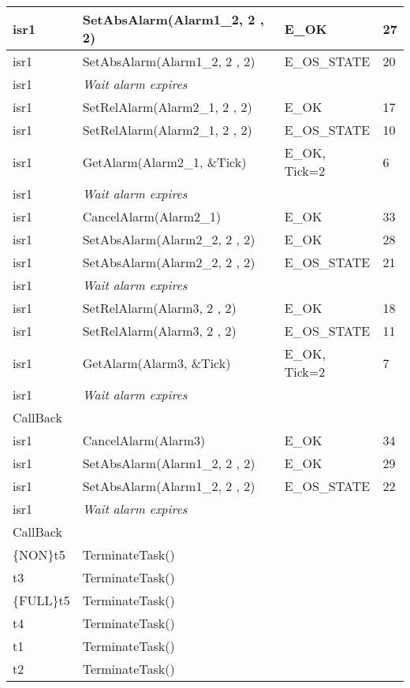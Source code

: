 \documentclass[10pt]{article}
\newlength{\Li}\settowidth{\Li}{Running}
\newlength{\Lii}\setlength{\Lii}{7cm}
\newlength{\Liiii}\setlength{\Liiii}{0.9cm}
\newlength{\Liii}\setlength{\Liii}{\textwidth} \addtolength{\Liii}{-\Li} \addtolength{\Liii}{-\Lii} \addtolength{\Liii}{-\Liiii}
\begin{document}
\begin{supertabular}{|p{\Li}|p{\Lii}|p{\Liii}|p{\Liiii}|}
	isr1	& SetAbsAlarm(Alarm1\_2, 2 , 2)						& E\_OK					& 27 \\ \hline
	isr1	& SetAbsAlarm(Alarm1\_2, 2 , 2)						& E\_OS\_STATE			& 20 \\ \hline
	isr1	& \textit{Wait alarm expires}						 	& 						&  \\ \hline 
	
	isr1	& SetRelAlarm(Alarm2\_1, 2 , 2)						& E\_OK					& 17 \\ \hline
	isr1	& SetRelAlarm(Alarm2\_1, 2 , 2)						& E\_OS\_STATE			& 10 \\ \hline
	isr1	& GetAlarm(Alarm2\_1, \&Tick)							& E\_OK, Tick=2			& 6 \\ \hline
	isr1	& \textit{Wait alarm expires}						 	& 						&  \\ \hline 
	isr1	& CancelAlarm(Alarm2\_1)							& E\_OK					& 33 \\ \hline
	
	isr1	& SetAbsAlarm(Alarm2\_2, 2 , 2)						& E\_OK					& 28 \\ \hline
	isr1	& SetAbsAlarm(Alarm2\_2, 2 , 2)						& E\_OS\_STATE			& 21 \\ \hline
	isr1	& \textit{Wait alarm expires}						 	& 						& \\ \hline 
	
	isr1	& SetRelAlarm(Alarm3, 2 , 2)							& E\_OK					& 18 \\ \hline
	isr1	& SetRelAlarm(Alarm3, 2 , 2)							& E\_OS\_STATE			& 11 \\ \hline
	isr1	& GetAlarm(Alarm3, \&Tick)							& E\_OK, Tick=2			& 7 \\ \hline
	isr1	& \textit{Wait alarm expires}						 	& 						& \\ \hline 
	CallBack & 											& 						& \\ \hline 
	isr1	& CancelAlarm(Alarm3)								& E\_OK					& 34 \\ \hline
	
	isr1	& SetAbsAlarm(Alarm1\_2, 2 , 2)						& E\_OK					& 29 \\ \hline
	isr1	& SetAbsAlarm(Alarm1\_2, 2 , 2)						& E\_OS\_STATE			& 22 \\ \hline
	isr1	& \textit{Wait alarm expires}						 	& 						& \\ \hline 
	CallBack & 											& 						& \\ \hline 
	
	\{NON\}t5 	& TerminateTask()								&						& \\ \hline 
	t3 	& TerminateTask()									&						& \\ \hline 
	\{FULL\}t5 	& TerminateTask()							&						& \\ \hline 
	t4 	& TerminateTask()									&						& \\ \hline 
	t1 	& TerminateTask()									&						& \\ \hline 
	t2 	& TerminateTask()									&						& \\ \hline 
	\end{supertabular} \\
	
\end{document}
